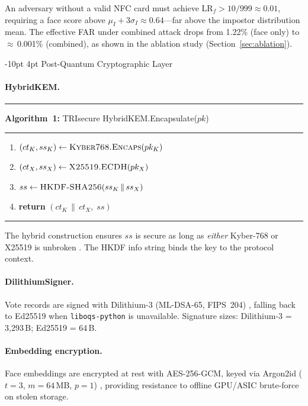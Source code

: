 \documentclass[a4paper,12pt]{article}
\makeatletter
\renewcommand\subsection{\@startsection{subsection}{2}{\z@}%
  {-10pt \@plus -3pt \@minus -2pt}{4pt \@plus 2pt}%
  {\normalfont\normalsize\itshape}}
\newcommand{\parencite}[1]{\citep{#1}}
\makeatother
\begin{document}
An adversary without a valid NFC card must achieve
$\mathrm{LR}_f > 10/999 \approx 0.01$, requiring a face score above
$\mu_I + 3\sigma_I \approx 0.64$---far above the impostor distribution
mean. The effective FAR under combined attack drops from 1.22\% (face
only) to $\approx$\,0.001\% (combined), as shown in the ablation study
(Section~\ref{sec:ablation}).

\subsection{Post-Quantum Cryptographic Layer}\label{sec:pqc}

\paragraph{HybridKEM.}

\medskip
\noindent\rule{\linewidth}{0.4pt}\smallskip
\noindent\textbf{Algorithm~1:} TRIsecure HybridKEM.Encapsulate($pk$)
\smallskip\noindent\rule{\linewidth}{0.4pt}
\renewcommand{\labelenumi}{\arabic{enumi}:}
\begin{enumerate}
  \setlength{\topsep}{2pt}\setlength{\itemsep}{1pt}
  \item $(ct_K, ss_K) \leftarrow \textsc{Kyber768.Encaps}(pk_K)$
  \item $(ct_X, ss_X) \leftarrow \textsc{X25519.ECDH}(pk_X)$
  \item $ss \leftarrow \textsc{HKDF-SHA256}(ss_K \,\|\, ss_X)$
  \item \textbf{return} $(ct_K \,\|\, ct_X,\; ss)$
\end{enumerate}
\renewcommand{\labelenumi}{\arabic{enumi}.}
\noindent\rule{\linewidth}{0.4pt}\medskip

The hybrid construction ensures $ss$ is secure as long as \emph{either}
Kyber-768 or X25519 is unbroken \parencite{bernstein2017post}. The HKDF
info string binds the key to the protocol context.

\paragraph{DilithiumSigner.}
Vote records are signed with Dilithium-3 (ML-DSA-65, FIPS~204)
\parencite{nist_fips204}, falling back to Ed25519 when
\texttt{liboqs-python} is unavailable. Signature sizes: Dilithium-3
= 3,293\,B; Ed25519 = 64\,B.

\paragraph{Embedding encryption.}
Face embeddings are encrypted at rest with AES-256-GCM, keyed via
Argon2id ($t{=}3$, $m{=}64$\,MB, $p{=}1$) \parencite{biryukov2015argon2},
providing resistance to offline GPU/ASIC brute-force on stolen storage.
\end{document}
